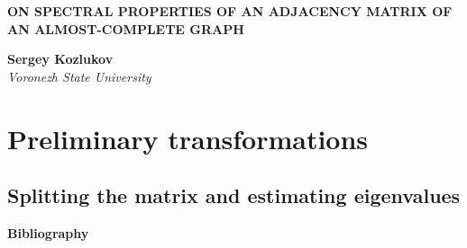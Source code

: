 \documentclass[12pt,a4paper,twoside]{article}
\theoremstyle{definition}
\begin{document}

\begin{center}
    \textbf{ON SPECTRAL PROPERTIES OF AN ADJACENCY MATRIX OF AN ALMOST-COMPLETE GRAPH}
    
    \textbf{Sergey Kozlukov}\\[2mm]
    \emph{Voronezh State University}
\end{center}


\begin{abstract}
    
\end{abstract}


\section*{Preliminary transformations}

\subsection*{Splitting the matrix and estimating eigenvalues}


\newpage

\smallskip\centerline{\bf Bibliography} 

\end{document}
